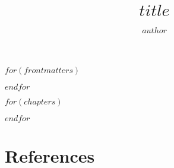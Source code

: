 \documentclass[nemilov1]{Nemilov}
\begin{document}
\frontmatter



\title{$title$}


\author{$author$}

\maketitle

\setcounter{page}{5}


\tableofcontents

$for(frontmatters)$

$endfor$


\mainmatter


$for(chapters)$

$endfor$

%
%

\appendix

%

\cleardoublepage

\chapter*{References}



\cleardoublepage
\printindex
\cleardoublepage


\clearpage
\end{document}
